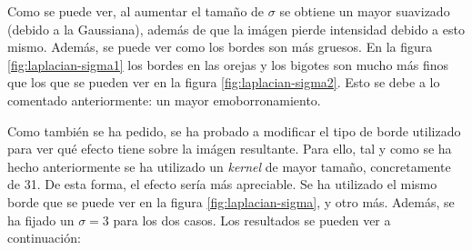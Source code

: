 \documentclass[11pt,a4paper]{article}
\begin{document}
Como se puede ver, al aumentar el tamaño de $\sigma$ se obtiene un mayor suavizado (debido a la Gaussiana), además de que
la imágen pierde intensidad debido a esto mismo. Además, se puede ver como los bordes son más gruesos. En la figura
\ref{fig:laplacian-sigma1} los bordes en las orejas y los bigotes son mucho más finos que los que se pueden ver en la
figura \ref{fig:laplacian-sigma2}. Esto se debe a lo comentado anteriormente: un mayor emoborronamiento.

Como también se ha pedido, se ha probado a modificar el tipo de borde utilizado para ver qué efecto tiene sobre la imágen
resultante. Para ello, tal y como se ha hecho anteriormente se ha utilizado un \textit{kernel} de mayor tamaño, concretamente
de 31. De esta forma, el efecto sería más apreciable. Se ha utilizado el mismo borde que se puede ver en la figura
\ref{fig:laplacian-sigma}, y otro más. Además, se ha fijado un $\sigma = 3$ para los dos casos. Los resultados se pueden ver
a continuación:
\end{document}
